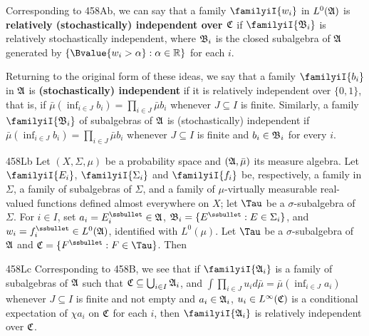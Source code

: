 Corresponding to 458Ab, we can say that a family $\familyiI{w_i}$ in
$L^0(\frak A)$ is {\bf relatively (stochastically) independent over
$\frak C$} if $\familyiI{\frak B_i}$ is relatively stochastically
independent, where $\frak B_i$ is the closed subalgebra of $\frak A$
generated by $\{\Bvalue{w_i>\alpha}:\alpha\in\Bbb R\}$ for each $i$.

Returning to the original form of these ideas, we say that a family
$\familyiI{b_i}$ in $\frak A$ is {\bf (stochastically) independent} if
it is relatively independent over $\{0,1\}$, that is, if
$\bar\mu(\inf_{i\in J}b_i)=\prod_{i\in J}\bar\mu b_i$ whenever
$J\subseteq I$ is finite.   Similarly, a family $\familyiI{\frak B_i}$ of
subalgebras of $\frak A$ is (stochastically) independent if
$\bar\mu(\inf_{i\in J}b_i)=\prod_{i\in J}\bar\mu b_i$ whenever
$J\subseteq I$ is finite and $b_i\in\frak B_i$ for every $i$.

\spheader 458Lb
Let $(X,\Sigma,\mu)$ be a probability space and
$(\frak A,\bar\mu)$ its measure algebra.   Let $\familyiI{E_i}$,
$\familyiI{\Sigma_i}$ and $\familyiI{f_i}$ be, respectively, a family in
$\Sigma$, a family of subalgebras of $\Sigma$, and a family of
$\mu$-virtually measurable real-valued functions defined almost everywhere
on $X$;  let $\Tau$ be a $\sigma$-subalgebra of $\Sigma$.   For $i\in I$,
set $a_i=E_i^{\ssbullet}\in\frak A$,
$\frak B_i=\{E^{\ssbullet}:E\in\Sigma_i\}$, and
$w_i=f_i^{\ssbullet}\in L^0(\frak A)$, identified with
$L^0(\mu)$.
Let $\Tau$ be a $\sigma$-subalgebra of
$\frak A$ and $\frak C=\{F^{\ssbullet}:F\in\Tau\}$.   Then



\spheader 458Lc
Corresponding to 458B, we see that if
$\familyiI{\frak A_i}$ is a family of subalgebras of $\frak A$ such that
$\frak C\subseteq\bigcup_{i\in I}\frak A_i$, and
$\int\prod_{i\in J}u_id\bar\mu=\bar\mu(\inf_{i\in J}a_i)$ whenever
$J\subseteq I$ is finite and not empty and $a_i\in\frak A_i$,
$u_i\in L^{\infty}(\frak C)$ is a conditional expectation of $\chi a_i$ on
$\frak C$ for each $i$, then $\familyiI{\frak A_i}$ is relatively
independent over $\frak C$.


